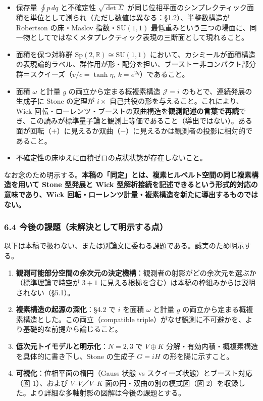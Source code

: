 \documentclass[
]{ltjsarticle}
\providecommand{\tightlist}{%
  \setlength{\itemsep}{0pt}\setlength{\parskip}{0pt}}
\begin{document}
\begin{itemize}
\tightlist
\item
  保存量 \(\oint p\,dq\) と不確定性 \(\sqrt{\det\Sigma}\)
  が同じ位相平面のシンプレクティック面積を単位として測られ（ただし数値は異なる：§1.2）、半整数構造が
  Robertson の床・Maslov 指数・\(\mathrm{SU}(1,1)\)
  最低重みという三つの場面に、同一物としてではなくメタプレクティック表現の三断面として現れること。
\item
  面積を保つ対称群 \(\mathrm{Sp}(2,\mathbb{R})\cong\mathrm{SU}(1,1)\)
  において、カシミールが面積構造の表現論的ラベル、群作用が形・配分を担い、ブースト＝非コンパクト部分群＝スクイーズ（\(v/c=\tanh\eta,\ k=e^{2\eta}\)）であること。
\item
  面積 \(\omega\) と計量 \(g\) の両立から定まる概複素構造
  \(\mathcal{J}=i\) のもとで、連続発展の生成子に Stone の定理が
  \(i\times\) 自己共役の形を与えること。これにより、Wick
  回転・ローレンツ・ブーストの双曲構造を\textbf{観測記述の言葉で再読}でき、この読みが標準量子論と観測上等価であること（導出ではない）。ある面が回転（\(+\)）に見えるか双曲（\(-\)）に見えるかは観測者の投影に相対的であること。
\item
  不確定性の床ゆえに面積ゼロの点状状態が存在しないこと。
\end{itemize}

なお念のため明示する。\textbf{本稿の「同定」とは、複素ヒルベルト空間の同じ複素構造を用いて
Stone 型発展と Wick
型解析接続を記述できるという形式的対応の意味であり、Wick
回転・ローレンツ計量・複素構造を新たに導出するものではない。}

\subsubsection{6.4
今後の課題（未解決として明示する点）}\label{ux4ecaux5f8cux306eux8ab2ux984cux672aux89e3ux6c7aux3068ux3057ux3066ux660eux793aux3059ux308bux70b9}

以下は本稿で扱わない、または別論文に委ねる課題である。誠実のため明示する。

\begin{enumerate}
\def\labelenumi{\arabic{enumi}.}
\tightlist
\item
  \textbf{観測可能部分空間の余次元の決定機構}：観測者の射影がどの余次元を選ぶか（標準理論で時空が
  \(3+1\) に見える根拠を含む）は本稿の枠組みからは説明されない（§5.1）。
\item
  \textbf{複素構造の起源の深化}：§4.2 で \(i\) を面積 \(\omega\) と計量
  \(g\) の両立から定まる概複素構造とした。この両立（compatible
  triple）がなぜ観測に不可避かを、より基礎的な前提から論じること。
\item
  \textbf{低次元トイモデルと明示化}：\(N=2,3\) で \(V\oplus K\)
  分解・有効内積・概複素構造を具体的に書き下し、Stone の生成子 \(G=iH\)
  の形を陽に示すこと。
\item
  \textbf{可視化}：位相平面の楕円（Gauss 状態 vs
  スクイーズ状態）とブースト対応（図 1）、および
  \(V\)--\(V\)／\(V\)--\(K\) 面の円・双曲の別の模式図（図
  2）を収録した。より詳細な多軸射影の図解は今後の課題とする。
\end{enumerate}
\end{document}
